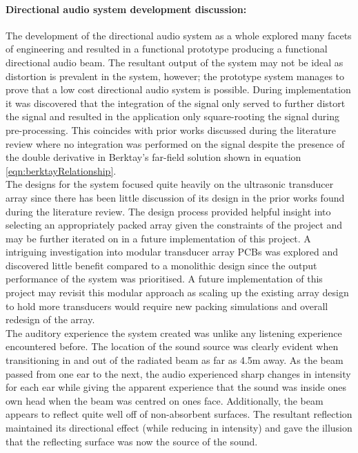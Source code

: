 \paragraph{Directional audio system development discussion:}
The development of the directional audio system as a whole explored many facets of engineering and resulted in a functional prototype producing a functional directional audio beam. The resultant output of the system may not be ideal as distortion is prevalent in the system, however; the prototype system manages to prove that a low cost directional audio system is possible. During implementation it was discovered that the integration of the signal only served to further distort the signal and resulted in the application only square-rooting the signal during pre-processing. This coincides with prior works discussed during the literature review where no integration was performed on the signal despite the presence of the double derivative in Berktay's far-field solution \cite{berktay_1965} shown in equation \ref{eqn:berktayRelationship}. \\%
The designs for the system focused quite heavily on the ultrasonic transducer array since there has been little discussion of its design in the prior works found during the literature review. The design process provided helpful insight into selecting an appropriately packed array given the constraints of the project and may be further iterated on in a future implementation of this project. A intriguing investigation into modular transducer array PCBs was explored and discovered little benefit compared to a monolithic design since the output performance of the system was prioritised. A future implementation of this project may revisit this modular approach as scaling up the existing array design to hold more transducers would require new packing simulations and overall redesign of the array.\\
The auditory experience the system created was unlike any listening experience encountered before. The location of the sound source was clearly evident when transitioning in and out of the radiated beam as far as 4.5m away. As the beam passed from one ear to the next, the audio experienced sharp changes in intensity for each ear while giving the apparent experience that the sound was inside ones own head when the beam was centred on ones face. Additionally, the beam appears to reflect quite well off of non-absorbent surfaces. The resultant reflection maintained its directional effect (while reducing in intensity) and gave the illusion that the reflecting surface was now the source of the sound.

